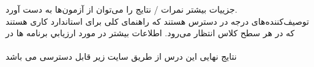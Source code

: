 \documentclass[a4 paper,12pt]{article}\usepackage{float, graphicx,xepersian }
\begin{document}
\noindent
جزییات بیشتر نمرات / نتایج را می‌توان از آزمون‌ها به دست آورد. \\ 
توصیف‌کننده‌های درجه در دسترس هستند که راهنمای کلی برای استاندارد کاری هستند که در هر سطح کلاس انتظار می‌رود. اطلاعات بیشتر در مورد ارزيابي برنامه ها در\\
 \\
\noindent
نتایج نهایی این درس از طریق سایت زیر قابل دسترسی می باشد\\
 \\
\end{document}
